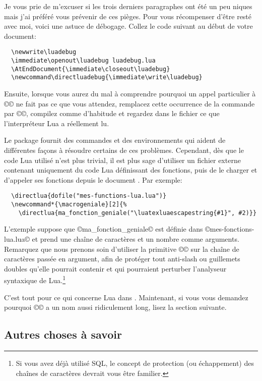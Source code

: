 \documentclass{lltxdoc}
\begin{document}
Je vous prie de m'excuser si les trois derniers paragraphes ont été un peu \tex{}niques
mais j'ai préféré vous prévenir de ces pièges. Pour vous récompenser d'être resté
avec moi, voici une astuce de débogage.
Collez le code suivant au début de votre document:
\begin{Verbatim}
  \newwrite\luadebug
  \immediate\openout\luadebug luadebug.lua
  \AtEndDocument{\immediate\closeout\luadebug}
  \newcommand\directluadebug{\immediate\write\luadebug}
\end{Verbatim}
Ensuite, lorsque vous aurez du mal à comprendre pourquoi un appel particulier
à ©\directlua© ne fait pas ce que vous attendez, remplacez cette occurrence
de la commande par ©\directluadebug©, compilez comme d'habitude et regardez
dans le fichier  ce que l'interpréteur Lua a réellement lu.

Le package  fournit des commandes et des environnements qui aident
de différentes façons à résoudre certains de ces problèmes. Cependant, dès que
le code Lua utilisé n'est plus trivial, il est plus sage d'utiliser un fichier
externe contenant uniquement du code Lua définissant des fonctions,
puis de le charger et d'appeler ses fonctions depuis le document \luatex.
Par exemple:
\begin{Verbatim}
  \directlua{dofile("mes-functions-lua.lua")}
  \newcommand*{\macrogeniale}[2]{%
    \directlua{ma_fonction_geniale("\luatexluaescapestring{#1}", #2)}}
\end{Verbatim}

L'exemple suppose que ©ma_fonction_geniale© est définie dans ©mes-fonctions-lua.lua©
et prend une chaîne de caractères et un nombre comme arguments. Remarquez que nous
prenons soin d'utiliser la primitive ©\luatexluaescapestring© sur la chaîne de
caractères passée en argument, afin de protéger tout anti-slash ou guillemets doubles
qu'elle pourrait contenir et qui pourraient perturber l'analyseur syntaxique de
Lua.\footnote{Si vous avez déjà utilisé SQL, le concept de protection (ou échappement)
  des chaînes de caractères devrait vous être familier.}

\medskip

C'est tout pour ce qui concerne Lua dans \tex. Maintenant, si vous vous
demandez pourquoi ©\luatexluaescapestring© a un nom aussi ridiculement long,
lisez la section suivante.

\subsection{Autres choses à savoir}\label{things}
\end{document}
